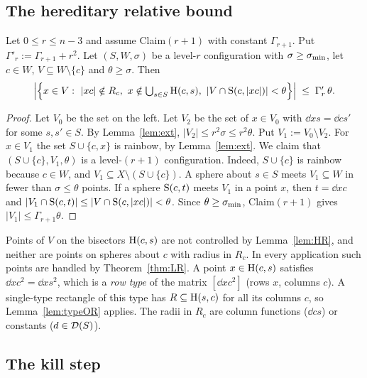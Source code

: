 \subsection{The hereditary relative bound}

\begin{lemma}[HR$_r$]\label{lem:HR}
Let $0\le r\le n-3$ and assume Claim$(r+1)$ with constant $\Gamma_{r+1}$. Put $\Gamma'_r:=\Gamma_{r+1}+r^2$.
Let $(S,W,\sigma)$ be a level-$r$ configuration with $\sigma\ge\sigma_{\min}$, let $c\in W$, $V\subseteq W\setminus\{c\}$ and
$\theta\ge\sigma$. Then
\[
\Bigl|\Bigl\{x\in V:\ |xc|\notin R_c,\ x\notin\textstyle\bigcup_{s\in S}\mathrm{H}(c,s),\ |V\cap\mathrm{S}(c,|xc|)|<\theta\Bigr\}\Bigr|
\;\le\;\Gamma'_r\,\theta .
\]
\end{lemma}
\begin{proof}
Let $V_0$ be the set on the left. Let $V_2$ be the set of $x\in V_0$ with $\dd xs=\dd c{s'}$ for some
$s,s'\in S$. By Lemma~\ref{lem:ext}, $|V_2|\le r^2\sigma\le r^2\theta$. Put $V_1:=V_0\setminus V_2$. For
$x\in V_1$ the set $S\cup\{c,x\}$ is rainbow, by Lemma~\ref{lem:ext}. We claim that $(S\cup\{c\},V_1,\theta)$ is a
level-$(r+1)$ configuration. Indeed, $S\cup\{c\}$ is rainbow because $c\in W$, and $V_1\subseteq X\setminus(S\cup\{c\})$.
A sphere about $s\in S$ meets $V_1\subseteq W$ in fewer than $\sigma\le\theta$ points. If a sphere $\mathrm{S}(c,t)$
meets $V_1$ in a point $x$, then $t=\dd xc$ and $|V_1\cap\mathrm{S}(c,t)|\le|V\cap\mathrm{S}(c,|xc|)|<\theta$. Since
$\theta\ge\sigma_{\min}$, Claim$(r+1)$ gives $|V_1|\le\Gamma_{r+1}\theta$.
\end{proof}

\begin{remark}\label{rem:bisector}
Points of $V$ on the bisectors $\mathrm{H}(c,s)$ are not controlled by Lemma~\ref{lem:HR}, and neither are points on
spheres about $c$ with radius in $R_c$. In every application such points are handled by Theorem~\ref{thm:LR}. A
point $x\in\mathrm{H}(c,s)$ satisfies $\dd xc^2=\dd xs^2$, which is a \emph{row type} of the matrix
$[\dd xc^2]$ (rows $x$, columns $c$). A single-type rectangle of this type has $R\subseteq\mathrm{H}(s,c)$ for all its
columns $c$, so Lemma~\ref{lem:typeOR} applies. The radii in $R_c$ are column functions ($\dd cs$) or constants
($d\in\mathcal{D}(S)$).
\end{remark}

\subsection{The kill step}

